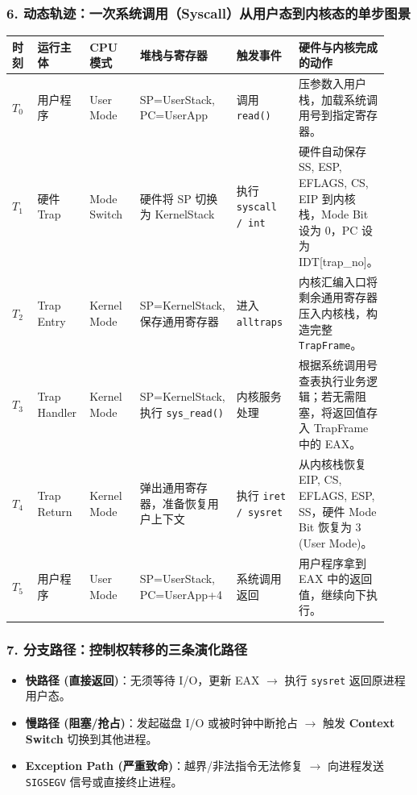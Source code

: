 \documentclass[11pt,a4paper,openany]{ctexbook}
\newcommand{\key}[1]{\textbf{\color{deep}#1}}
\begin{document}
\subsubsection*{6. 动态轨迹：一次系统调用（Syscall）从用户态到内核态的单步图景}
\begingroup
\small
\setlength{\tabcolsep}{2.5pt}
\begin{longtable}{p{0.07\linewidth}p{0.14\linewidth}p{0.14\linewidth}p{0.22\linewidth}p{0.17\linewidth}p{0.19\linewidth}}
\toprule
\textbf{时刻} & \textbf{运行主体} & \textbf{CPU 模式} & \textbf{堆栈与寄存器} & \textbf{触发事件} & \textbf{硬件与内核完成的动作} \\
\midrule
$T_0$ & 用户程序 & User Mode & SP=UserStack, PC=UserApp & 调用 \texttt{read()} & 压参数入用户栈，加载系统调用号到指定寄存器。 \\
\midrule
$T_1$ & 硬件 Trap & Mode Switch & 硬件将 SP 切换为 KernelStack & 执行 \texttt{syscall / int} & 硬件自动保存 SS, ESP, EFLAGS, CS, EIP 到内核栈，Mode Bit 设为 0，PC 设为 IDT[trap\_no]。 \\
\midrule
$T_2$ & Trap Entry & Kernel Mode & SP=KernelStack, 保存通用寄存器 & 进入 \texttt{alltraps} & 内核汇编入口将剩余通用寄存器压入内核栈，构造完整 \texttt{TrapFrame}。 \\
\midrule
$T_3$ & Trap Handler & Kernel Mode & SP=KernelStack, 执行 \texttt{sys\_read()} & 内核服务处理 & 根据系统调用号查表执行业务逻辑；若无需阻塞，将返回值存入 TrapFrame 中的 EAX。 \\
\midrule
$T_4$ & Trap Return & Kernel Mode & 弹出通用寄存器，准备恢复用户上下文 & 执行 \texttt{iret / sysret} & 从内核栈恢复 EIP, CS, EFLAGS, ESP, SS，硬件 Mode Bit 恢复为 3 (User Mode)。 \\
\midrule
$T_5$ & 用户程序 & User Mode & SP=UserStack, PC=UserApp+4 & 系统调用返回 & 用户程序拿到 EAX 中的返回值，继续向下执行。 \\
\bottomrule
\end{longtable}
\endgroup

\subsubsection*{7. 分支路径：控制权转移的三条演化路径}
\begin{itemize}[leftmargin=1.5em]
  \item \textbf{快路径 (直接返回)}：无须等待 I/O，更新 EAX $\rightarrow$ 执行 \texttt{sysret} 返回原进程用户态。
  \item \textbf{慢路径 (阻塞/抢占)}：发起磁盘 I/O 或被时钟中断抢占 $\rightarrow$ 触发 \key{Context Switch} 切换到其他进程。
  \item \textbf{Exception Path (严重致命)}：越界/非法指令无法修复 $\rightarrow$ 向进程发送 \texttt{SIGSEGV} 信号或直接终止进程。
\end{itemize}
\end{document}
